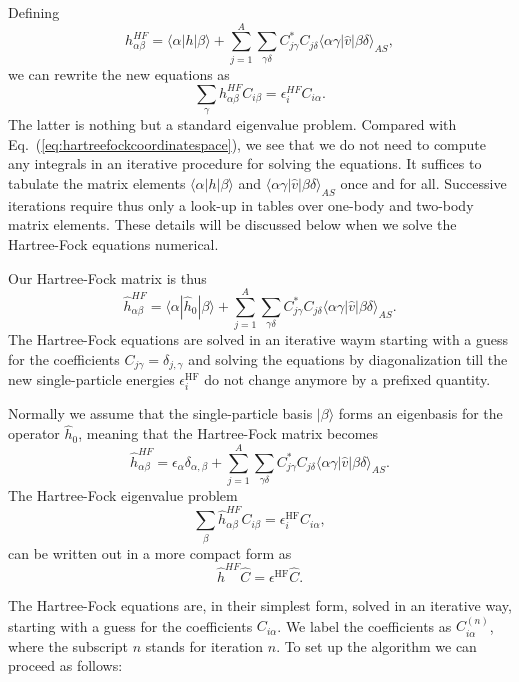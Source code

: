 Defining 
\[
h_{\alpha\beta}^{HF}=\langle \alpha | h | \beta \rangle+
\sum_{j=1}^A\sum_{\gamma\delta} C^*_{j\gamma}C_{j\delta}\langle \alpha\gamma|\hat{v}|\beta\delta\rangle_{AS},
\]
we can rewrite the new equations as 
\begin{equation}
\sum_{\gamma}h_{\alpha\beta}^{HF}C_{i\beta}=\epsilon_i^{HF}C_{i\alpha}. \label{eq:newhf}
\end{equation}
The latter is nothing but a standard eigenvalue problem. Compared with
Eq.~(\ref{eq:hartreefockcoordinatespace}), we see that we do not need
to compute any integrals in an iterative procedure for solving the
equations.  It suffices to tabulate the matrix elements
$\langle \alpha | h | \beta \rangle$ and
$\langle \alpha\gamma|\hat{v}|\beta\delta\rangle_{AS}$ once and for
all. Successive iterations require thus only a look-up in tables over
one-body and two-body matrix elements. These details will be discussed
below when we solve the Hartree-Fock equations numerical.


Our Hartree-Fock matrix is thus
\[
\hat{h}_{\alpha\beta}^{HF}=\langle \alpha | \hat{h}_0 | \beta \rangle+
\sum_{j=1}^A\sum_{\gamma\delta} C^*_{j\gamma}C_{j\delta}\langle \alpha\gamma|\hat{v}|\beta\delta\rangle_{AS}.
\]
The Hartree-Fock equations are solved in an iterative waym starting
with a guess for the coefficients $C_{j\gamma}=\delta_{j,\gamma}$ and
solving the equations by diagonalization till the new single-particle
energies $\epsilon_i^{\mathrm{HF}}$ do not change anymore by a
prefixed quantity.




Normally we assume that the single-particle basis $|\beta\rangle$
forms an eigenbasis for the operator $\hat{h}_0$, meaning that the
Hartree-Fock matrix becomes
\[
\hat{h}_{\alpha\beta}^{HF}=\epsilon_{\alpha}\delta_{\alpha,\beta}+
\sum_{j=1}^A\sum_{\gamma\delta} C^*_{j\gamma}C_{j\delta}\langle \alpha\gamma|\hat{v}|\beta\delta\rangle_{AS}.
\]
The Hartree-Fock eigenvalue problem
\[
\sum_{\beta}\hat{h}_{\alpha\beta}^{HF}C_{i\beta}=\epsilon_i^{\mathrm{HF}}C_{i\alpha},
\]
can be written out in a more compact form as
\[
\hat{h}^{HF}\hat{C}=\epsilon^{\mathrm{HF}}\hat{C}. 
\]




The Hartree-Fock equations are, in their simplest form, solved in an
iterative way, starting with a guess for the coefficients
$C_{i\alpha}$. We label the coefficients as $C_{i\alpha}^{(n)}$, where
the subscript $n$ stands for iteration $n$.  To set up the algorithm
we can proceed as follows:

